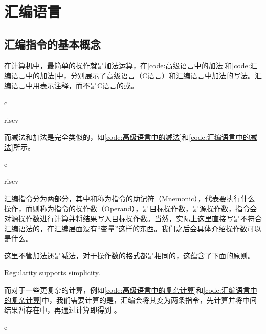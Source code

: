 \section{汇编语言}

\subsection{汇编指令的基本概念}

在计算机中，最简单的操作就是加法运算，在\cref{code:高级语言中的加法}和\cref{code:汇编语言中的加法}中，分别展示了高级语言（C语言）和汇编语言中加法的写法。汇编语言中用\code{#}表示注释，而不是C语言的\code{//}或\code{/**/}。

\begin{Code}[高级语言中的加法]{c}
    
\end{Code}

\begin{Code}[汇编语言中的加法]{riscv}
    
\end{Code}

而减法和加法是完全类似的，如\cref{code:高级语言中的减法}和\cref{code:汇编语言中的减法}所示。\goodbreak

\begin{Code}[高级语言中的减法]{c}
    
\end{Code}

\begin{Code}[汇编语言中的减法]{riscv}
    
\end{Code}

汇编指令分为两部分，其中和称为指令的助记符（Mnemonic），代表要执行什么操作，而则称为指令的操作数（Operand），是目标操作数，是源操作数，指令会对源操作数进行计算并将结果写入目标操作数。当然，实际上这里直接写是不符合汇编语法的，在汇编层面没有“变量”这样的东西。我们之后会具体介绍操作数可以是什么。

这里不管加法还是减法，对于操作数的格式都是相同的，这蕴含了下面的原则。
\begin{BoxDesignPrinciple}[规律性即简洁性]
    \centering
    Regularity supports simplicity.
\end{BoxDesignPrinciple}

而对于一些更复杂的计算，例如\cref{code:高级语言中的复杂计算}和\cref{code:汇编语言中的复杂计算}中，我们需要计算的是，汇编会将其变为两条指令，先计算并将中间结果暂存在中，再通过计算即得到 。
\begin{Code}[高级语言中的复杂计算]{c}
    
\end{Code}

